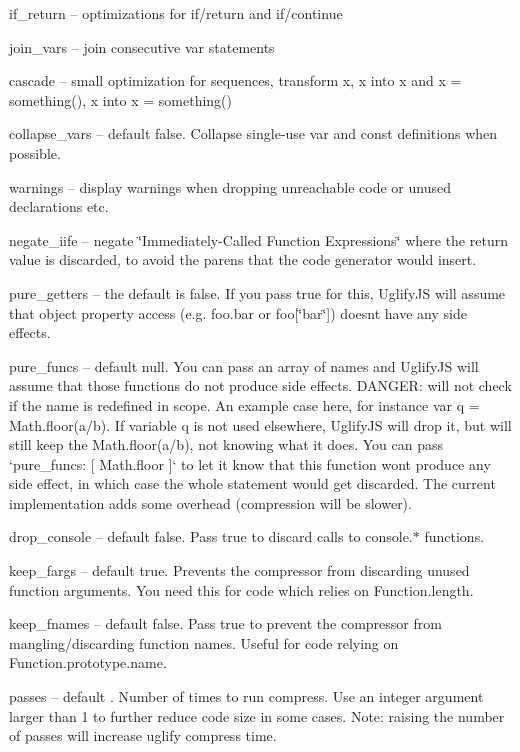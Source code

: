 \begin{DoxyItemize}
\item {\ttfamily if\+\_\+return} -- optimizations for if/return and if/continue
\item {\ttfamily join\+\_\+vars} -- join consecutive {\ttfamily var} statements
\item {\ttfamily cascade} -- small optimization for sequences, transform {\ttfamily x, x} into {\ttfamily x} and {\ttfamily x = something(), x} into {\ttfamily x = something()}
\item {\ttfamily collapse\+\_\+vars} -- default {\ttfamily false}. Collapse single-\/use {\ttfamily var} and {\ttfamily const} definitions when possible.
\item {\ttfamily warnings} -- display warnings when dropping unreachable code or unused declarations etc.
\item {\ttfamily negate\+\_\+iife} -- negate \char`\"{}\+Immediately-\/\+Called Function Expressions\char`\"{} where the return value is discarded, to avoid the parens that the code generator would insert.
\item {\ttfamily pure\+\_\+getters} -- the default is {\ttfamily false}. If you pass {\ttfamily true} for this, Uglify\+JS will assume that object property access (e.\+g. {\ttfamily foo.\+bar} or {\ttfamily foo\mbox{[}\char`\"{}bar\char`\"{}\mbox{]}}) doesn\textquotesingle{}t have any side effects.
\item {\ttfamily pure\+\_\+funcs} -- default {\ttfamily null}. You can pass an array of names and Uglify\+JS will assume that those functions do not produce side effects. D\+A\+N\+G\+ER\+: will not check if the name is redefined in scope. An example case here, for instance {\ttfamily var q = Math.\+floor(a/b)}. If variable {\ttfamily q} is not used elsewhere, Uglify\+JS will drop it, but will still keep the {\ttfamily Math.\+floor(a/b)}, not knowing what it does. You can pass `pure\+\_\+funcs\+: \mbox{[} \textquotesingle{}Math.\+floor\textquotesingle{} \mbox{]}` to let it know that this function won\textquotesingle{}t produce any side effect, in which case the whole statement would get discarded. The current implementation adds some overhead (compression will be slower).
\item {\ttfamily drop\+\_\+console} -- default {\ttfamily false}. Pass {\ttfamily true} to discard calls to {\ttfamily console.$\ast$} functions.
\item {\ttfamily keep\+\_\+fargs} -- default {\ttfamily true}. Prevents the compressor from discarding unused function arguments. You need this for code which relies on {\ttfamily Function.\+length}.
\item {\ttfamily keep\+\_\+fnames} -- default {\ttfamily false}. Pass {\ttfamily true} to prevent the compressor from mangling/discarding function names. Useful for code relying on {\ttfamily Function.\+prototype.\+name}.
\item {\ttfamily passes} -- default {}. Number of times to run compress. Use an integer argument larger than 1 to further reduce code size in some cases. Note\+: raising the number of passes will increase uglify compress time.
\end{DoxyItemize}

